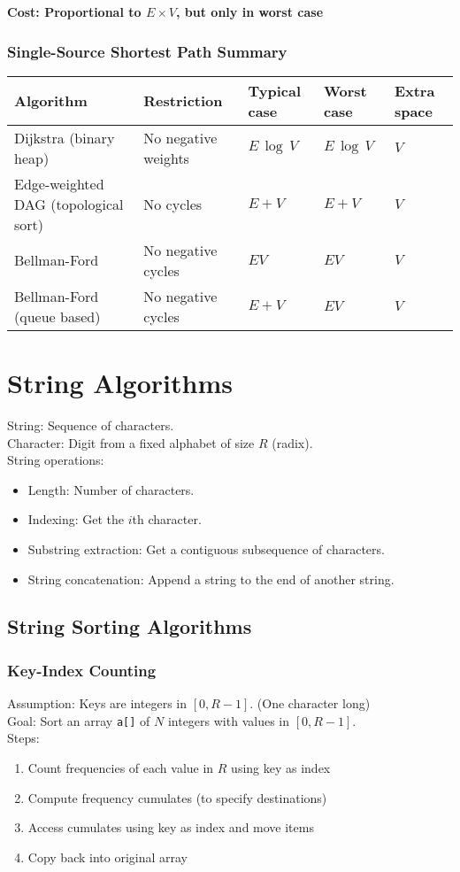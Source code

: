 \documentclass[a4paper]{article}
\begin{document}
\textbf{Cost: Proportional to $E\times V$, but only in worst case}

\subsubsection*{Single-Source Shortest Path Summary}
\begin{spacing}{1.5}
\begin{tabularx}{1\textwidth}{|X|X|X|X|X|}
    \hline
    \textbf{Algorithm}&\textbf{Restriction} & \textbf{Typical case}& \textbf{Worst case}&\textbf{Extra space} \\
    \hline
    Dijkstra (binary heap)&No negative weights&$E\,\log\,V$&$E\,\log\,V$&$V$\\
    \hline
    Edge-weighted DAG (topological sort)&No cycles&$E+V$&$E+V$&$V$\\
    \hline
    Bellman-Ford&No negative cycles&$EV$&$EV$&$V$\\
    \hline
    Bellman-Ford (queue based)&No negative cycles&$E+V$&$EV$&$V$\\
    \hline
\end{tabularx}
\end{spacing}

\section{String Algorithms}
String: Sequence of characters.\\
Character: Digit from a fixed alphabet of size $R$ (radix).\\
String operations:
\begin{itemize}
    \item Length: Number of characters.
    \item Indexing: Get the $i$th character.
    \item Substring extraction: Get a contiguous subsequence of characters.
    \item String concatenation: Append a string to the end of another string.
\end{itemize}

\subsection{String Sorting Algorithms}
\subsubsection*{Key-Index Counting}
Assumption: Keys are integers in $[0, R-1]$. (One character long)\\
Goal: Sort an array \verb|a[]| of $N$ integers with values in $[0, R-1]$.\\
Steps:
\begin{enumerate}
    \item Count frequencies of each value in $R$ using key as index
    \item Compute frequency cumulates (to specify destinations)
    \item Access cumulates using key as index and move items
    \item Copy back into original array
\end{enumerate}
\end{document}
